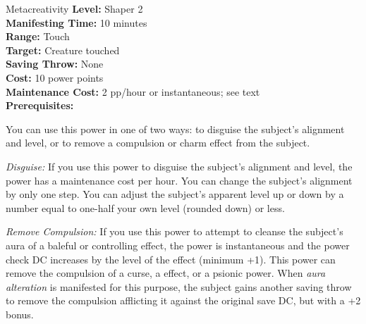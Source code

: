 {Metacreativity}
{
    \textbf{Level:}
    Shaper 2\\
    \textbf{Manifesting Time:}
    10 minutes\\
    \textbf{Range:}
    Touch\\
    \textbf{Target:}
    Creature touched\\
    \textbf{Saving Throw:}
    None\\
    \textbf{Cost:}
    10 power points\\
    \textbf{Maintenance Cost:}
    2 pp/hour or instantaneous; see text\\
    \textbf{Prerequisites:}
    \\
}
{
    You can use this power in one of two ways: to disguise the subject's alignment and level, or to remove a compulsion or charm effect from the subject.

    \textit{Disguise:} If you use this power to disguise the subject's alignment and level, the power has a maintenance cost per hour. You can change the subject's alignment by only one step. You can adjust the subject's apparent level up or down by a number equal to one-half your own level (rounded down) or less.

    \textit{Remove Compulsion:} If you use this power to attempt to cleanse the subject's aura of a baleful or controlling effect, the power is instantaneous and the power check DC increases by the level of the effect (minimum +1). This power can remove the compulsion of a curse, a  effect, or a psionic power. When \emph{aura alteration} is manifested for this purpose, the subject gains another saving throw to remove the compulsion afflicting it against the original save DC, but with a +2 bonus.
}
